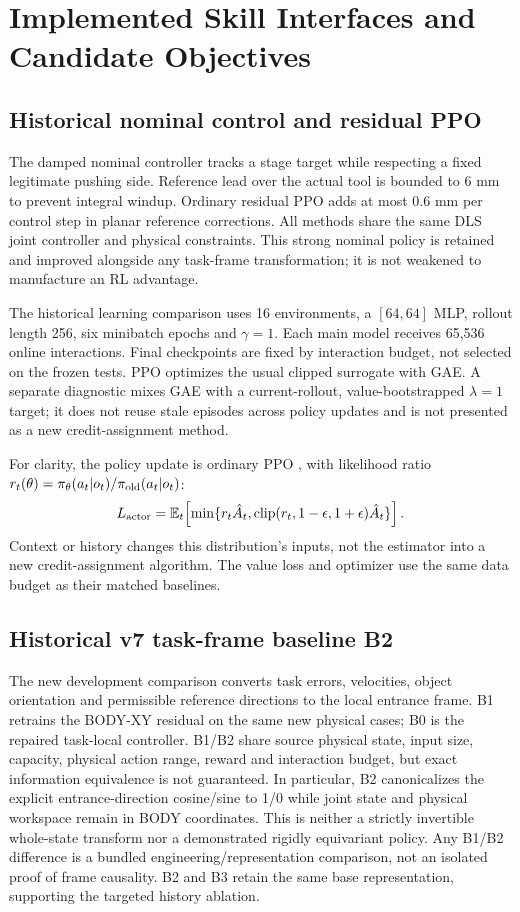 \section{Implemented Skill Interfaces and Candidate Objectives}
\subsection{Historical nominal control and residual PPO}
The damped nominal controller tracks a stage target while respecting a fixed legitimate pushing side. Reference lead over the actual tool is bounded to 6 mm to prevent integral windup. Ordinary residual PPO adds at most 0.6 mm per control step in planar reference corrections. All methods share the same DLS joint controller and physical constraints. This strong nominal policy is retained and improved alongside any task-frame transformation; it is not weakened to manufacture an RL advantage.

The historical learning comparison uses 16 environments, a $[64,64]$ MLP, rollout length 256, six minibatch epochs and $\gamma=1$. Each main model receives 65,536 online interactions. Final checkpoints are fixed by interaction budget, not selected on the frozen tests. PPO optimizes the usual clipped surrogate with GAE. A separate diagnostic mixes GAE with a current-rollout, value-bootstrapped $\lambda=1$ target; it does not reuse stale episodes across policy updates and is not presented as a new credit-assignment method.

For clarity, the policy update is ordinary PPO \cite{schulman2017ppo}, with likelihood ratio $r_t(\theta)=\pi_\theta(a_t|o_t)/\pi_{\rm old}(a_t|o_t)$:
\begin{equation}
 L_{\rm actor}=\mathbb{E}_t\!\left[\min\{r_t\hat A_t,
 \operatorname{clip}(r_t,1-\epsilon,1+\epsilon)\hat A_t\}\right].
\end{equation}
Context or history changes this distribution's inputs, not the estimator into a new credit-assignment algorithm. The value loss and optimizer use the same data budget as their matched baselines.

\subsection{Historical v7 task-frame baseline B2}
The new development comparison converts task errors, velocities, object orientation and permissible reference directions to the local entrance frame. B1 retrains the BODY-XY residual on the same new physical cases; B0 is the repaired task-local controller. B1/B2 share source physical state, input size, capacity, physical action range, reward and interaction budget, but exact information equivalence is not guaranteed. In particular, B2 canonicalizes the explicit entrance-direction cosine/sine to 1/0 while joint state and physical workspace remain in BODY coordinates. This is neither a strictly invertible whole-state transform nor a demonstrated rigidly equivariant policy. Any B1/B2 difference is a bundled engineering/representation comparison, not an isolated proof of frame causality. B2 and B3 retain the same base representation, supporting the targeted history ablation.


